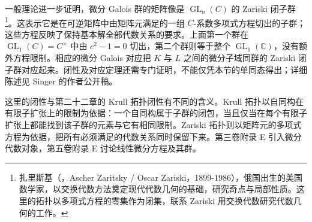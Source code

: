 一般理论进一步证明，微分 Galois 群的矩阵像是 \(\operatorname{GL}_n(C)\) 的 Zariski 闭子群\footnote{扎里斯基（，Ascher Zaritsky / Oscar Zariski，1899-1986），俄国出生的美国数学家，以交换代数方法奠定现代代数几何的基础，研究奇点与局部性质。这里的拓扑以多项式方程的零集作为闭集，联系 Zariski 用交换代数研究代数几何的工作。}。这表示它是在可逆矩阵中由矩阵元满足的一组 \(C\)-系数多项式方程切出的子群；这些方程反映了保持基本解全部代数关系的要求。上面第一个群在 \(\operatorname{GL}_1(C)=C^\times\) 中由 \(c^2-1=0\) 切出，第二个群则等于整个 \(\operatorname{GL}_1(\mathbb C)\)，没有额外方程限制。相应的微分 Galois 对应把 \(K\) 与 \(L\) 之间的微分子域同群的 Zariski 闭子群对应起来。闭性及对应定理还需专门证明，不能仅凭本节的单同态得出；详细陈述见 Singer 的作者公开稿\cite[Definition 1.3.5, Proposition 1.3.6 and Theorem 1.3.9]{Singer2009DifferentialGalois}。

\ProseParagraphBreak
这里的闭性与第二十二章的 Krull 拓扑闭性有不同的含义。Krull 拓扑以自同构在有限子扩张上的限制为依据：一个自同构属于子群的闭包，当且仅当在每个有限子扩张上都能找到该子群的元素与它有相同限制。Zariski 拓扑则以矩阵元的多项式方程为依据，把所有必须满足的代数关系同时保留下来。第三卷附录 E 引入微分代数对象，第五卷附录 E 讨论线性微分方程及其群。
